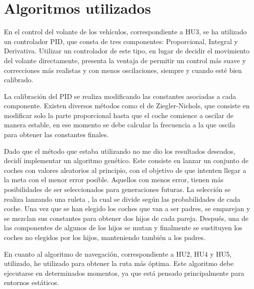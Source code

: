 
\section{Algoritmos utilizados}
En el control del volante de los vehículos, correspondiente a HU3, se ha utilizado un controlador PID, que consta de tres componentes: Proporcional, Integral y Derivativa. Utilizar un controlador de este tipo, en lugar de decidir el movimiento del volante directamente, presenta la ventaja de permitir un control más suave y correcciones más realistas y con menos oscilaciones, siempre y cuando esté bien calibrado.

\bigskip

La calibración del PID se realiza modificando las constantes asociadas a cada componente. Existen diversos métodos como el de Ziegler-Nichols\cite{enwiki:1140258750}, que consiste en modificar solo la parte proporcional hasta que el coche comience a oscilar de manera estable, en ese momento se debe calcular la frecuencia a la que oscila para obtener las constantes finales. 

\bigskip

Dado que el método que estaba utilizando no me dio los resultados deseados, decidí implementar un algoritmo genético. Este consiste en lanzar un conjunto de coches con valores aleatorios al principio, con el objetivo de que intenten llegar a la meta con el menor error posible. Aquellos con menos error, tienen más posibilidades de ser seleccionados para generaciones futuras. La selección se realiza lanzando una ruleta \cite{enwiki:1141636554}, la cual se divide según las probabilidades de cada coche. Una vez que se han elegido los coches que van a ser padres, se emparejan y se mezclan sus constantes para obtener dos hijos de cada pareja. Después, una de las componentes de algunos de los hijos se mutan y finalmente se sustituyen los coches no elegidos por los hijos, manteniendo también a los padres.

\bigskip

En cuanto al algoritmo de navegación, correspondiente a HU2, HU4 y HU5, utilizado, he utilizado \finalAlg para obtener la ruta más óptima. Este algoritmo debe ejecutarse en determinados momentos, ya que está pensado principalmente para entornos estáticos.